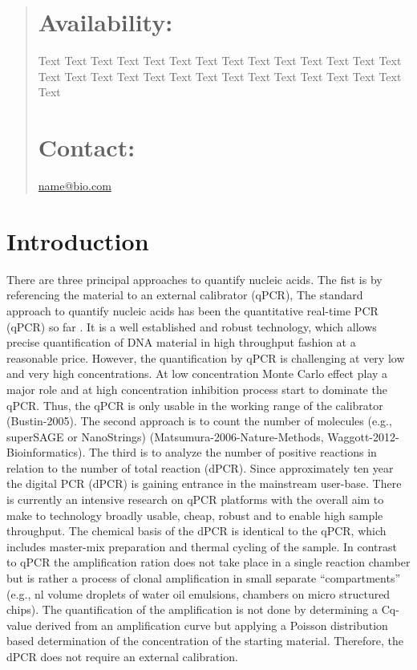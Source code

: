 \documentclass{bioinfo}
\begin{document}
\begin{abstract}
\section{Availability:}
Text  Text Text Text Text Text Text Text Text Text  Text Text Text Text Text Text Text Text Text  Text Text Text Text Text Text Text Text Text  Text

\section{Contact:} \href{name@bio.com}{name@bio.com}
\end{abstract}

\section{Introduction}
There are three principal approaches to quantify nucleic acids. The fist is by 
referencing the material to an external calibrator (qPCR), The standard approach 
to quantify nucleic acids has been the quantitative real-time PCR (qPCR) so far \cite{pabinger_survey_2014}. 
It is a well established and robust technology, which allows precise 
quantification of DNA material in high throughput fashion at a reasonable price. 
However, the quantification by qPCR is challenging at very low and very high 
concentrations. At low concentration Monte Carlo effect play a major role and at 
high concentration inhibition process start to dominate the qPCR. Thus, the qPCR 
is only usable in the working range of the calibrator (Bustin-2005). The second 
approach is to count the number of molecules (e.g., superSAGE or NanoStrings) 
(Matsumura-2006-Nature-Methods, Waggott-2012-Bioinformatics). The third is to 
analyze the number of positive reactions in relation to the number of total 
reaction (dPCR). Since approximately ten year the digital PCR (dPCR) is gaining 
entrance in the mainstream user-base. There is currently an intensive research 
on qPCR platforms with the overall aim to make to technology broadly usable, 
cheap, robust and to enable high sample throughput. The chemical basis of the 
dPCR is identical to the qPCR, which includes master-mix preparation and thermal 
cycling of the sample. In contrast to qPCR the amplification ration does not 
take place in a single reaction chamber but is rather a process of clonal 
amplification in small separate ``compartments'' (e.g., nl volume droplets of 
water oil emulsions, chambers on micro structured chips). The quantification of 
the amplification is not done by determining a Cq-value derived from an 
amplification curve but applying a Poisson distribution based determination of 
the concentration of the starting material. Therefore, the dPCR does not require 
an external calibration.
\end{document}
